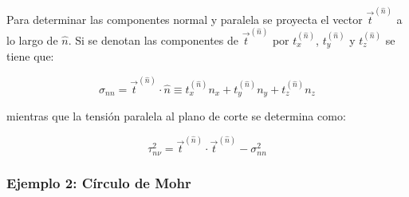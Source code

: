\documentclass[../notas medios.tex]{subfiles}
\begin{document}
Para determinar las componentes normal y paralela se proyecta el vector ${{\vec t}^{(\hat n)}}$ a lo largo de $\hat{n}$. Si se denotan las componentes de ${{\vec t}^{(\hat n)}}$ por $t_x^{(\hat n)}$, $t_y^{(\hat n)}$  y $t_z^{(\hat n)}$  se tiene que:

\[{\sigma _{nn}} = {{\vec t}^{(\hat n)}} \cdot \hat n \equiv t_x^{(\hat n)}{n_x} + t_y^{(\hat n)}{n_y} + t_z^{(\hat n)}{n_z}\]

mientras que la tensión paralela al plano de corte se determina como:

\[\tau _{n\nu }^2 = {{\vec t}^{(\hat n)}} \cdot {{\vec t}^{(\hat n)}} - \sigma _{nn}^2\]



%
\subsubsection*{Ejemplo 2: Círculo de Mohr} 
\end{document}
